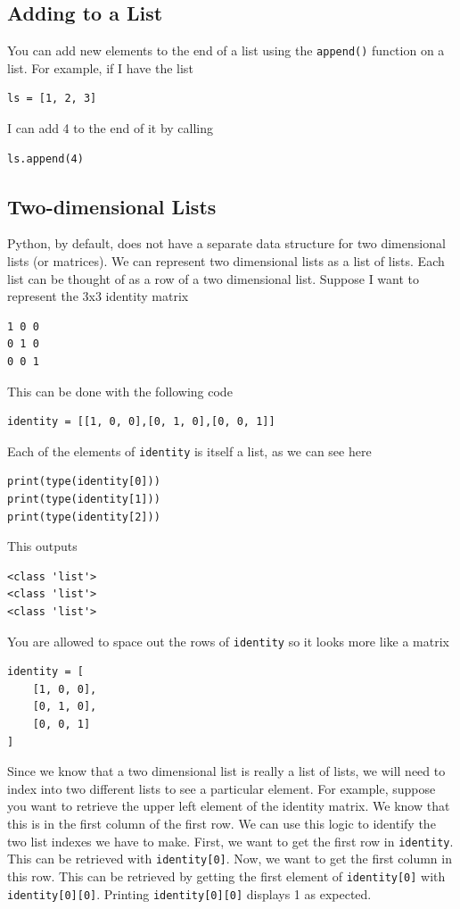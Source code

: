 \documentclass{article}
\begin{document}
\subsection{Adding to a List}
You can add new elements to the end of a list using the \texttt{append()} function on a list. For example, if I have the list
\begin{verbatim}
ls = [1, 2, 3]
\end{verbatim}
I can add 4 to the end of it by calling
\begin{verbatim}
ls.append(4)
\end{verbatim}

\subsection{Two-dimensional Lists}
Python, by default, does not have a separate data structure for two dimensional lists (or matrices). We can represent two dimensional lists as a list of lists. Each list can be thought of as a row of a two dimensional list. Suppose I want to represent the 3x3 identity matrix
\begin{verbatim}
1 0 0
0 1 0
0 0 1
\end{verbatim}
This can be done with the following code
\begin{verbatim}
identity = [[1, 0, 0],[0, 1, 0],[0, 0, 1]]
\end{verbatim}
Each of the elements of \texttt{identity} is itself a list, as we can see here
\begin{verbatim}
print(type(identity[0]))
print(type(identity[1]))
print(type(identity[2]))
\end{verbatim}
This outputs
\begin{verbatim}
<class 'list'>
<class 'list'>
<class 'list'>
\end{verbatim}
You are allowed to space out the rows of \texttt{identity} so it looks more like a matrix
\begin{verbatim}
identity = [
    [1, 0, 0],
    [0, 1, 0],
    [0, 0, 1]
]    
\end{verbatim}
Since we know that a two dimensional list is really a list of lists, we will need to index into two different lists to see a particular element. For example, suppose you want to retrieve the upper left element of the identity matrix. We know that this is in the first column of the first row. We can use this logic to identify the two list indexes we have to make. First, we want to get the first row in \texttt{identity}. This can be retrieved with \texttt{identity[0]}. Now, we want to get the first column in this row. This can be retrieved by getting the first element of \texttt{identity[0]} with \texttt{identity[0][0]}. Printing \texttt{identity[0][0]} displays 1 as expected.\\\\
\end{document}
